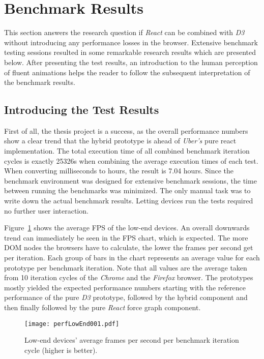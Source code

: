 \section{Benchmark Results}

This section answers the research question if \emph{React} can be combined with \emph{D3} without introducing any performance losses in the browser. Extensive benchmark testing sessions resulted in some remarkable research results which are presented below. After presenting the test results, an introduction to the human perception of fluent animations helps the reader to follow the subsequent interpretation of the benchmark results.

\subsection{Introducing the Test Results}

First of all, the thesis project is a success, as the overall performance numbers show a clear trend that the hybrid prototype is ahead of \emph{Uber's} pure react implementation. The total execution time of all combined benchmark iteration cycles is exactly 25326s when combining the average execution times of each test. When converting milliseconds to hours, the result is 7.04 hours. Since the benchmark environment was designed for extensive benchmark sessions, the time between running the benchmarks was minimized. The only manual task was to write down the actual benchmark results. Letting devices run the tests required no further user interaction. 

Figure~\ref{fig:perfLowEnd001} shows the average FPS of the low-end devices. An overall downwards trend can immediately be seen in the FPS chart, which is expected. The more DOM nodes the browsers have to calculate, the lower the frames per second get per iteration. Each group of bars in the chart represents an average value for each prototype per benchmark iteration. Note that all values are the average taken from 10 iteration cycles of the \emph{Chrome} and the \emph{Firefox} browser. The prototypes mostly yielded the expected performance numbers starting with the reference performance of the pure \emph{D3} prototype, followed by the hybrid component and then finally followed by the pure \emph{React} force graph component.

\begin{figure}
\centering
\texttt{[image: perfLowEnd001.pdf]}
\caption{Low-end devices' average frames per second per benchmark iteration cycle (higher is better).}
\label{fig:perfLowEnd001}
\end{figure}

